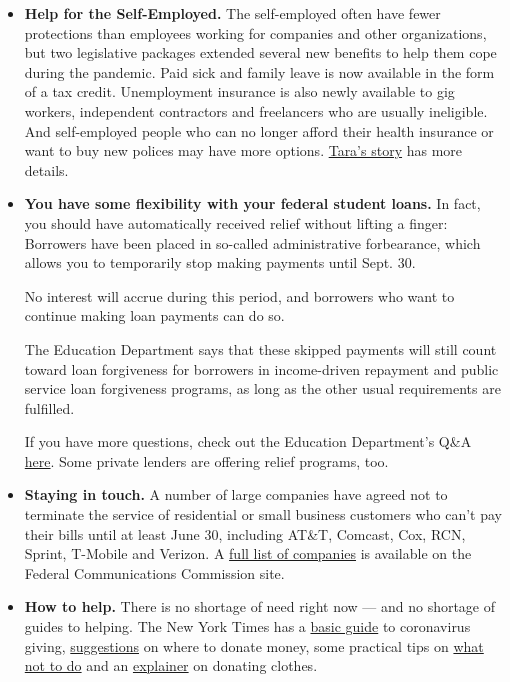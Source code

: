 \begin{itemize}
\item
  \textbf{Help for the Self-Employed.} The self-employed often have
  fewer protections than employees working for companies and other
  organizations, but two legislative packages extended several new
  benefits to help them cope during the pandemic. Paid sick and family
  leave is now available in the form of a tax credit. Unemployment
  insurance is also newly available to gig workers, independent
  contractors and freelancers who are usually ineligible. And
  self-employed people who can no longer afford their health insurance
  or want to buy new polices may have more options.
  \href{https://www.nytimes3xbfgragh.onion/article/self-employed-workers-unemployment-coronavirus-stimulus-package.html}{Tara's
  story} has more details.
\item
  \textbf{You have some flexibility with your federal student loans.} In
  fact, you should have automatically received relief without lifting a
  finger: Borrowers have been placed in so-called administrative
  forbearance, which allows you to temporarily stop making payments
  until Sept. 30.

  No interest will accrue during this period, and borrowers who want to
  continue making loan payments can do so.

  The Education Department says that these skipped payments will still
  count toward loan forgiveness for borrowers in income-driven repayment
  and public service loan forgiveness programs, as long as the other
  usual requirements are fulfilled.

  If you have more questions, check out the Education Department's Q\&A
  \href{https://studentaid.gov/announcements-events/coronavirus\#borrower-questions}{here}.
  Some private lenders are offering relief programs, too.
\item
  \textbf{Staying in touch.} A number of large companies have agreed not
  to terminate the service of residential or small business customers
  who can't pay their bills until at least June 30, including AT\&T,
  Comcast, Cox, RCN, Sprint, T-Mobile and Verizon. A
  \href{https://www.fcc.gov/keep-americans-connected\#pledges}{full list
  of companies} is available on the Federal Communications Commission
  site.
\item
  \textbf{How to help.} There is no shortage of need right now --- and
  no shortage of guides to helping. The New York Times has a
  \href{https://www.nytimes3xbfgragh.onion/article/coronavirus-how-to-help-donations-charities.html}{basic
  guide} to coronavirus giving,
  \href{https://www.nytimes3xbfgragh.onion/2020/03/27/smarter-living/coronavirus-charity-donations.html}{suggestions}
  on where to donate money, some practical tips on
  \href{https://www.nytimes3xbfgragh.onion/2020/04/10/nyregion/coronavirus-help-healthcare-workers.html}{what
  not to do} and an
  \href{https://www.nytimes3xbfgragh.onion/2020/04/13/style/self-care/donate-clothes-coronavirus.html}{explainer}
  on donating clothes.


\end{itemize}
